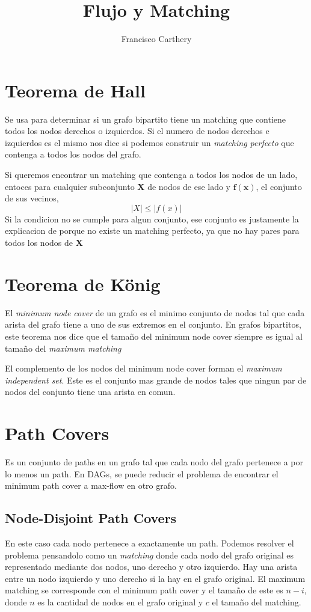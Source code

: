 \documentclass{article}
\title{Flujo y Matching}
\author{Francisco Carthery}
\begin{document}
\maketitle

\section{Teorema de Hall}
Se usa para determinar si un grafo bipartito tiene un matching que contiene todos los nodos derechos o izquierdos. Si el numero de nodos derechos e izquierdos es el mismo nos dice si podemos construir un \textit{matching perfecto} que contenga a todos los nodos del grafo.

Si queremos encontrar un matching que contenga a todos los nodos de un lado, entoces para cualquier subconjunto $\bm{X}$ de nodos de ese lado y $\bm{f(x)}$, el conjunto de sus vecinos,
\[
|X| \leq |f(x)|
\]
Si la condicion no se cumple para algun conjunto, ese conjunto es justamente la explicacion de porque no existe un matching perfecto, ya que no hay pares para todos los nodos de $\bm{X}$

\section{Teorema de König}
El \textit{minimum node cover} de un grafo es el minimo conjunto de nodos tal que cada arista del grafo tiene a uno de sus extremos en el conjunto. En grafos bipartitos, este teorema nos dice que el tamaño del minimum node cover siempre es igual al tamaño del \textit{maximum matching}

El complemento de los nodos del minimum node cover forman el \textit{maximum independent set}. Este es el conjunto mas grande de nodos tales que ningun par de nodos del conjunto tiene una arista en comun.

\section{Path Covers}
Es un conjunto de paths en un grafo tal que cada nodo del grafo pertenece a por lo menos un path. En DAGs, se puede reducir el problema de encontrar el minimum path cover a max-flow en otro grafo.

\subsection{Node-Disjoint Path Covers}
En este caso cada nodo pertenece a exactamente un path. Podemos resolver el problema pensandolo como un \textit{matching} donde cada nodo del grafo original es representado mediante dos nodos, uno derecho y otro izquierdo. Hay una arista entre un nodo izquierdo y uno derecho si la hay en el grafo original. El maximum matching se corresponde con el minimum path cover y el tamaño de este es $n - i$, donde $n$ es la cantidad de nodos en el grafo original y $c$ el tamaño del matching.
\end{document}
